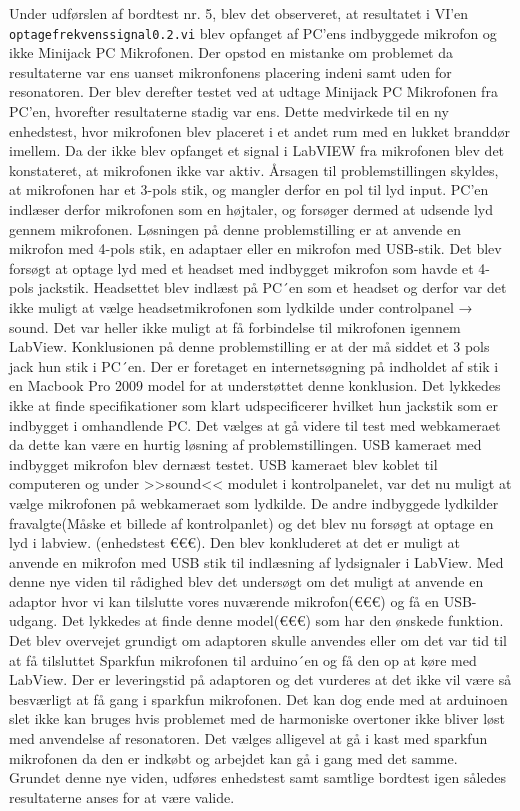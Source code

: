 Under udførslen af bordtest nr. 5, blev det observeret, at resultatet i VI'en \texttt{optagefrekvenssignal0.2.vi} blev opfanget af PC'ens indbyggede mikrofon og ikke Minijack PC Mikrofonen.
Der opstod en mistanke om problemet da resultaterne var ens uanset mikronfonens placering indeni samt uden for resonatoren. Der blev derefter testet ved at udtage Minijack PC Mikrofonen fra PC'en, hvorefter resultaterne stadig var ens. Dette medvirkede til en ny enhedstest, hvor mikrofonen blev placeret i et andet rum med en lukket branddør imellem. Da der ikke blev opfanget et signal i LabVIEW fra mikrofonen blev det konstateret, at mikrofonen ikke var aktiv. Årsagen til problemstillingen skyldes, at mikrofonen har et 3-pols stik, og mangler derfor en pol til lyd input. PC'en indlæser derfor mikrofonen som en højtaler, og forsøger dermed at udsende lyd gennem mikrofonen.
Løsningen på denne problemstilling er at anvende en mikrofon med 4-pols stik, en adaptaer eller en mikrofon med USB-stik.
Det blev forsøgt at optage lyd med et headset med indbygget mikrofon som havde et 4-pols jackstik. Headsettet blev indlæst på PC´en som et headset og derfor var det ikke muligt at vælge headsetmikrofonen som lydkilde under controlpanel → sound. Det var heller ikke muligt at få forbindelse til mikrofonen igennem LabView.  Konklusionen på denne problemstilling er at der må siddet et 3 pols jack hun stik i PC´en. Der er foretaget en internetsøgning på indholdet af stik i en Macbook Pro 2009 model for at understøttet denne konklusion. Det lykkedes ikke at finde specifikationer som klart udspecificerer hvilket hun jackstik som er indbygget i omhandlende PC. Det vælges at gå videre til test med webkameraet da dette kan være en hurtig løsning af problemstillingen. 
USB kameraet med indbygget mikrofon blev dernæst testet. USB kameraet blev koblet til computeren og under >>sound<< modulet i kontrolpanelet, var det nu muligt at vælge mikrofonen på webkameraet som lydkilde. De andre indbyggede lydkilder fravalgte(Måske et billede af kontrolpanlet) og det blev nu forsøgt at optage en lyd i labview. (enhedstest €€€). Den blev konkluderet at det er muligt at anvende en mikrofon med USB stik til indlæsning af lydsignaler i LabView. Med denne nye viden til rådighed blev det undersøgt om det muligt at
anvende en adaptor hvor vi kan tilslutte vores nuværende mikrofon(€€€) og få en USB-udgang. Det lykkedes at finde denne model(€€€) som har den ønskede funktion. 
Det blev overvejet grundigt om adaptoren skulle anvendes eller om det var tid til at få tilsluttet Sparkfun mikrofonen til arduino´en og få den op at køre med LabView. Der er leveringstid på adaptoren og det vurderes at det ikke vil være så besværligt at få gang i sparkfun mikrofonen. Det kan dog ende med at arduinoen slet ikke kan bruges hvis problemet med de harmoniske overtoner ikke bliver løst med anvendelse af resonatoren. Det vælges alligevel at gå i kast med sparkfun mikrofonen da den er indkøbt og arbejdet kan gå i gang med det samme. 
Grundet denne nye viden, udføres enhedstest samt samtlige bordtest igen således resultaterne anses for at være valide.

